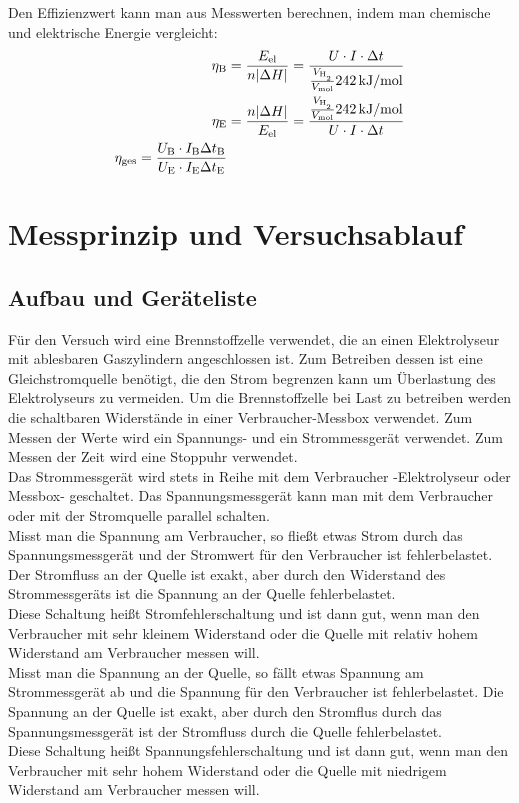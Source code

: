 \documentclass[a4paper,12pt,bibtotocnumbered]{scrartcl}
\numberwithin{equation}{section} %
\begin{document}
Den Effizienzwert kann man aus Messwerten berechnen, indem man chemische und elektrische Energie vergleicht:
\begin{align}
\eta_\text{B} &= \frac{E_\text{el}}{n |\Delta H|} = \frac{U\cdot I\cdot \Delta t}{ \frac{V_{\ce{H_2}}}{V_{\si{mol}}} \SI{242}{kJ\per mol}}\\
\eta_\text{E} &= \frac{n |\Delta H|}{E_\text{el}} = \frac{ \frac{V_{\ce{H_2}}}{V_{\si{mol}}} \SI{242}{kJ\per mol}}{U\cdot I\cdot \Delta t}\\
\eta_\text{ges}=\frac{U_\text{B} \cdot I_\text{B} \Delta t_\text{B}}{U_\text{E} \cdot I_\text{E} \Delta t_\text{E}}
\end{align}

\section[Messprinzip]{Messprinzip und Versuchsablauf}

\subsection{Aufbau und Geräteliste}
Für den Versuch wird eine Brennstoffzelle verwendet, die an einen Elektrolyseur mit ablesbaren Gaszylindern angeschlossen ist. Zum Betreiben dessen ist eine  Gleichstromquelle benötigt, die den Strom begrenzen kann um Überlastung des Elektrolyseurs zu vermeiden. Um die Brennstoffzelle bei Last zu betreiben werden die schaltbaren Widerstände in einer Verbraucher-Messbox verwendet. Zum Messen der Werte wird ein Spannungs- und ein Strommessgerät verwendet. Zum Messen der Zeit wird eine Stoppuhr verwendet.\\
Das Strommessgerät wird stets in Reihe mit dem Verbraucher -Elektrolyseur oder Messbox- geschaltet. Das Spannungsmessgerät kann man mit dem Verbraucher oder mit der Stromquelle parallel schalten. \\
Misst man die Spannung am Verbraucher, so fließt etwas Strom durch das Spannungsmessgerät und der Stromwert für den Verbraucher ist fehlerbelastet. Der Stromfluss an der Quelle ist exakt, aber durch den Widerstand des Strommessgeräts ist die Spannung an der Quelle fehlerbelastet. \\
Diese Schaltung heißt Stromfehlerschaltung und ist dann gut, wenn man den Verbraucher mit sehr kleinem Widerstand oder die Quelle mit relativ hohem Widerstand am Verbraucher messen will.\\
Misst man die Spannung an der Quelle, so fällt etwas Spannung am Strommessgerät ab und die Spannung für den Verbraucher ist fehlerbelastet. Die Spannung an der Quelle ist exakt, aber durch den Stromflus durch das Spannungsmessgerät ist der Stromfluss durch die Quelle fehlerbelastet. \\
Diese Schaltung heißt Spannungsfehlerschaltung und ist dann gut, wenn man den Verbraucher mit sehr hohem Widerstand oder die Quelle mit niedrigem Widerstand am Verbraucher messen will.\\
\end{document}
